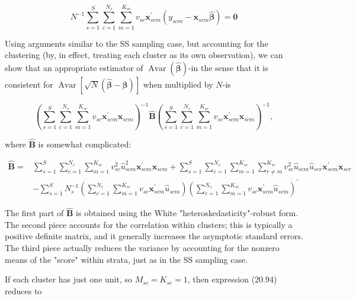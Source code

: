 \documentclass[10pt]{article}
\begin{document}
\begin{equation*}
N^{-1} \sum_{s=1}^{S} \sum_{c=1}^{N_{s}} \sum_{m=1}^{K_{s c}} v_{s c} \mathbf{x}_{s c m}^{\prime}\left(y_{s c m}-\mathbf{x}_{s c m} \hat{\boldsymbol{\beta}}\right)=\mathbf{0} \tag{20.93}
\end{equation*}


Using arguments similar to the SS sampling case, but accounting for the clustering (by, in effect, treating each cluster as its own observation), we can show that an appropriate estimator of $\operatorname{Avar}(\hat{\boldsymbol{\beta}})$-in the sense that it is consistent for $\operatorname{Avar}[\sqrt{N}(\hat{\boldsymbol{\beta}}-\boldsymbol{\beta})]$ when multiplied by $N$-is


\begin{equation*}
\left(\sum_{s=1}^{S} \sum_{c=1}^{N_{s}} \sum_{m=1}^{K_{s c}} v_{s c} \mathbf{x}_{s c m}^{\prime} \mathbf{x}_{s c m}\right)^{-1} \hat{\mathbf{B}}\left(\sum_{s=1}^{S} \sum_{c=1}^{N_{s}} \sum_{m=1}^{K_{s c}} v_{s c} \mathbf{x}_{s c m}^{\prime} \mathbf{x}_{s c m}\right)^{-1}, \tag{20.94}
\end{equation*}


where $\hat{\mathbf{B}}$ is somewhat complicated:


\begin{align*}
\hat{\mathbf{B}}= & \sum_{s=1}^{S} \sum_{c=1}^{N_{s}} \sum_{m=1}^{K_{s c}} v_{s c}^{2} \hat{u}_{s c m}^{2} \mathbf{x}_{s c m}^{\prime} \mathbf{x}_{s c m}+\sum_{s=1}^{S} \sum_{c=1}^{N_{s}} \sum_{m=1}^{K_{s c}} \sum_{r \neq m}^{K_{s c}} v_{s c}^{2} \hat{u}_{s c m} \hat{u}_{s c r} \mathbf{x}_{s c m}^{\prime} \mathbf{x}_{s c r} \\
& -\sum_{s=1}^{S} N_{s}^{-1}\left(\sum_{c=1}^{N_{s}} \sum_{m=1}^{K_{s c}} v_{s c} \mathbf{x}_{s c m}^{\prime} \hat{u}_{s c m}\right)\left(\sum_{c=1}^{N_{s}} \sum_{m=1}^{K_{s c}} v_{s c} \mathbf{x}_{s c m}^{\prime} \hat{u}_{s c m}\right)^{\prime} \tag{20.95}
\end{align*}


The first part of $\hat{\mathbf{B}}$ is obtained using the White "heteroskedasticity"-robust form. The second piece accounts for the correlation within clusters; this is typically a positive definite matrix, and it generally increases the asymptotic standard errors. The third piece actually reduces the variance by accounting for the nonzero means of the "score" within strata, just as in the SS sampling case.

If each cluster has just one unit, so $M_{s c}=K_{s c}=1$, then expression (20.94) reduces to
\end{document}
